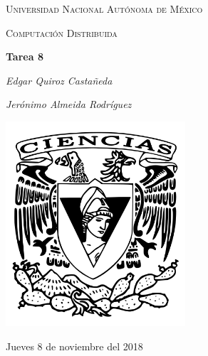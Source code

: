 \documentclass[12pt,a4paper]{report}
\begin{document}
\begin{titlepage}
	\centering
	{\scshape\LARGE Universidad Nacional Autónoma de México \par}
	\vspace{1cm}
	{\scshape\Large Computación Distribuida\par}
	\vspace{1.5cm}
	{\huge\bfseries Tarea 8\par}
	\vspace{.5cm}
	{\Large\itshape Edgar Quiroz Castañeda \par}
	\vspace{.5cm}
	{\Large\itshape Jerónimo Almeida Rodríguez \par}
	\vfill
	 \includegraphics[width=0.5\textwidth]{escudo_f-ciencias.png}
	\vfill

	{\large Jueves 8 de noviembre del 2018 \par}
\end{titlepage}

\pagebreak
\setlength{\voffset}{-0.75in}
\setlength{\headsep}{5pt}
\end{document}
